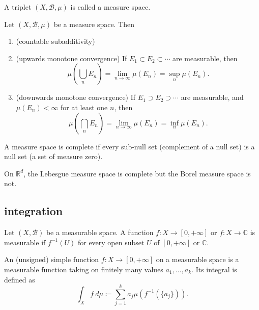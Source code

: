 \documentclass[12pt]{article}
\begin{document}
\begin{definition}
	A triplet $(X,\mathcal{B},\mu)$ is called a measure space.
\end{definition}

\begin{proposition}[]
	Let $(X,\mathcal{B},\mu)$ be a measure space. Then \hfill
	\begin{enumerate}
		\item (countable subadditivity)
		\item (upwards monotone convergence) If $E_1\subset E_2\subset\cdots$ are measurable, then 
			\begin{equation*}
				\mu(\bigcup_n E_n)=\lim_{n\to\infty}\mu(E_n)=\sup_n\mu(E_n).
			\end{equation*}
		\item (downwards monotone convergence) If $E_1\supset E_2\supset\cdots$ are measurable, and $\mu(E_n)<\infty$ for at least one $n$, then 
			\begin{equation*}
				\mu(\bigcap_n E_n)=\lim_{n\to\infty}\mu(E_n)=\inf_n\mu(E_n).
			\end{equation*}
	\end{enumerate}
\end{proposition}

\begin{definition}[completeness]
	A measure space is complete if every sub-null set (complement of a null set) is a null set (a set of measure zero).
\end{definition}

\begin{remark}[]
	On $\mathbb{R}^d$, the Lebesgue measure space is complete but the Borel measure space is not.
\end{remark}



\subsection{integration} %

\begin{definition}
	Let $(X,\mathcal{B})$ be a measurable space. A function $f:X\to[0,+\infty]$ or $f:X\to\mathbb{C}$ is measurable if $f^{-1}(U)$ for every open subset $U$ of $[0,+\infty]$ or $\mathbb{C}$.
\end{definition}

\begin{definition}
	An (unsigned) simple function $f:X\to[0,+\infty]$ on a measurable space is a measurable function taking on finitely many values $a_1,\dots,a_k$. Its integral is defined as 
	\begin{equation*}
		\int_X f\ d\mu\coloneqq\sum_{j=1}^k a_j\mu(f^{-1}(\{a_j\})).
	\end{equation*}
\end{definition}
\end{document}
